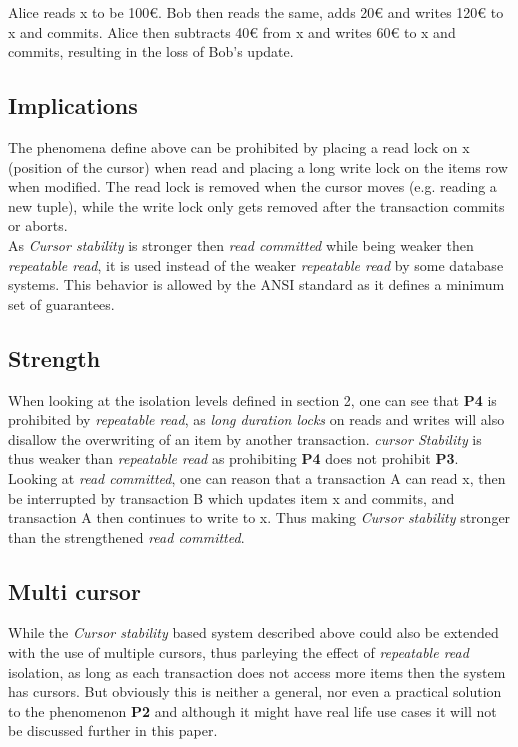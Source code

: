 \documentclass[sigconf, review=false]{acmart}
\begin{document}
\begin{example}
    Alice reads x to be 100€. Bob then reads the same, adds 20€ and writes 120€ to x and commits.
    Alice then subtracts 40€ from x and writes 60€ to x and commits, resulting in the loss of Bob's update.
\end{example}

\subsection{Implications}
The phenomena define above can be prohibited by placing a read lock on x (position of the cursor) when
read and placing a long write lock on the items row when modified.
The read lock is removed when the cursor moves (e.g. reading a new tuple),
while the write lock only gets removed after the transaction commits or aborts.\\
As \emph{Cursor stability} is stronger then \emph{read committed} while being weaker then \emph{repeatable read}, it
is used instead of the weaker \emph{repeatable read} by some database systems. This behavior is allowed by the ANSI standard
as it defines a minimum set of guarantees.
\subsection{Strength}
When looking at the isolation levels defined in section 2, one can see that \textbf{P4} is prohibited by \emph{repeatable read},
as \emph{long duration locks} on reads and writes will also disallow the overwriting of an item by another transaction.
\emph{cursor Stability} is thus weaker than \emph{repeatable read} as prohibiting \textbf{P4} does not prohibit \textbf{P3}.
Looking at \emph{read committed}, one can reason that a transaction A can read x, then be interrupted by transaction B which updates
item x and commits, and transaction A then continues to write to x.
Thus making \emph{Cursor stability} stronger than the strengthened \emph{read committed}.
\subsection{Multi cursor}
While the \emph{Cursor stability} based system described above could also be extended with the use of multiple cursors, thus
parleying the effect of \emph{repeatable read} isolation, as long as each transaction does not access more items
then the system has cursors. But obviously this is neither a general, nor even a practical solution to the phenomenon \textbf{P2} and
although it might have real life use cases it will not be discussed further in this paper.
\end{document}
